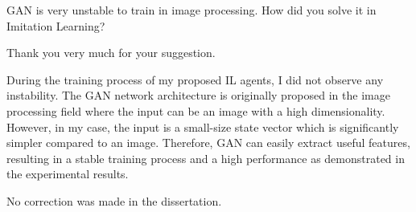 
\begin{revcomment}
  GAN is very unstable to train in image processing.
  How did you solve it in Imitation Learning?
\end{revcomment}
\begin{revresponse}
  Thank you very much for your suggestion.

  During the training process of my proposed IL agents, I did not observe any instability.
  The GAN network architecture is originally proposed in the image processing field where the input can be an image with a high dimensionality.
  However, in my case, the input is a small-size state vector which is significantly simpler compared to an image.
  Therefore, GAN can easily extract useful features, resulting in a stable training process and a high performance as demonstrated in the experimental results.

  \begin{correction}
    No correction was made in the dissertation.
  \end{correction}
\end{revresponse}
